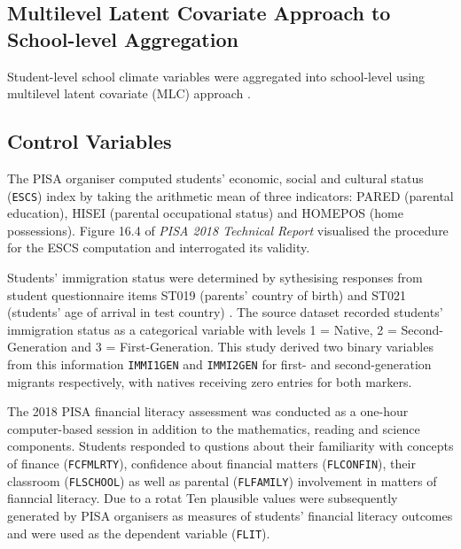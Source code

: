 \documentclass[a4paper,11pt,UKenglish,twoside,openright]{report}\usepackage[]{graphicx}\usepackage[]{color}
\begin{document}
\subsection{Multilevel Latent Covariate Approach to School-level Aggregation}

Student-level school climate variables were aggregated into school-level using multilevel latent covariate (MLC) approach \parencite{ludtke:2008, marsh:2009}.

\subsection{Control Variables}

The PISA organiser computed students' economic, social and cultural status (\texttt{ESCS}) index by taking the arithmetic mean of three indicators: \textsf{PARED} (parental education), \textsf{HISEI} (parental occupational status) and \textsf{HOMEPOS} (home possessions). Figure 16.4 of \textit{PISA 2018 Technical Report} \parencite{PISAtech} visualised the procedure for the ESCS computation and \textcite{avvisati:2020} interrogated its validity.

Students' immigration status were determined by sythesising responses from student questionnaire items \textsf{ST019} (parents' country of birth) and \textsf{ST021} (students' age of arrival in test country) \parencite[][pp. 212--213]{PISAvol3}. The source dataset \parencite{FLdata} recorded students' immigration status as a categorical variable with levels \textsf{1 = Native}, \textsf{2 = Second-Generation} and \textsf{3 = First-Generation}. This study derived two binary variables from this information \texttt{IMMI1GEN} and \texttt{IMMI2GEN} for first- and second-generation migrants respectively, with natives receiving zero entries for both markers.



The 2018 PISA financial literacy assessment was conducted as a one-hour computer-based session in addition to the mathematics, reading and science components. Students responded to qustions about their familiarity with concepts of finance (\texttt{FCFMLRTY}), confidence about financial matters (\texttt{FLCONFIN}), their classroom (\texttt{FLSCHOOL}) as well as parental (\texttt{FLFAMILY}) involvement in matters of fianncial literacy. Due to a rotat Ten plausible values were subsequently generated by PISA organisers as measures of students' financial literacy outcomes and were used as the dependent variable (\texttt{FLIT}).
\end{document}
